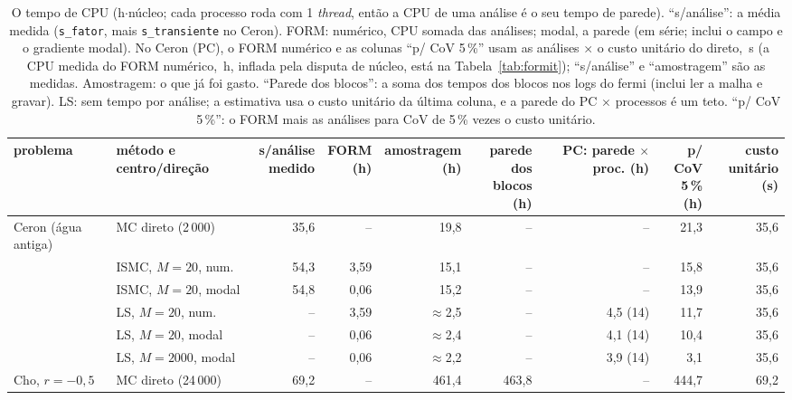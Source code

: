 \begin{landscape}
\begin{table}[H]\centering\footnotesize
\caption{O tempo de CPU (h$\cdot$núcleo; cada processo roda com 1 \emph{thread}, então a CPU de uma análise é o seu tempo de parede). ``s/análise'': a média medida (\texttt{s\_fator}, mais \texttt{s\_transiente} no Ceron). FORM: numérico, CPU somada das análises; modal, a parede (em série; inclui o campo e o gradiente modal). No Ceron (PC), o FORM numérico e as colunas ``p/ CoV 5\,\%'' usam as análises $\times$ o custo unitário do direto, \uDirCe{}\,s (a CPU medida do FORM numérico, \formCeronCpu{}\,h, inflada pela disputa de núcleo, está na Tabela~\ref{tab:formit}); ``s/análise'' e ``amostragem'' são as medidas. Amostragem: o que já foi gasto. ``Parede dos blocos'': a soma dos tempos dos blocos nos logs do fermi (inclui ler a malha e gravar). LS: sem tempo por análise; a estimativa usa o custo unitário da última coluna, e a parede do PC $\times$ processos é um teto. ``p/ CoV 5\,\%'': o FORM mais as análises para CoV de 5\,\% vezes o custo unitário.}\label{tab:tempo}
\begin{tabular}{llrrrrrrr}\toprule
problema & método e centro/direção & \makecell{s/análise\\medido} & \makecell{FORM\\(h)} & \makecell{amostragem\\(h)} & \makecell{parede dos\\blocos (h)} & \makecell{PC: parede\\$\times$ proc. (h)} & \makecell{p/ CoV\\5\,\% (h)} & \makecell{custo\\unitário (s)} \\\midrule
Ceron (água antiga) & MC direto (2\,000) & 35,6 & -- & 19,8 & -- & -- & 21,3 & 35,6 \\
 & ISMC, $M = 20$, num. & 54,3 & 3,59 & 15,1 & -- & -- & 15,8 & 35,6 \\
 & ISMC, $M = 20$, modal & 54,8 & 0,06 & 15,2 & -- & -- & 13,9 & 35,6 \\
 & LS, $M = 20$, num. & -- & 3,59 & $\approx$2,5 & -- & 4,5 (14) & 11,7 & 35,6 \\
 & LS, $M = 20$, modal & -- & 0,06 & $\approx$2,4 & -- & 4,1 (14) & 10,4 & 35,6 \\
 & LS, $M = 2000$, modal & -- & 0,06 & $\approx$2,2 & -- & 3,9 (14) & 3,1 & 35,6 \\
\midrule
Cho, $r = -0{,}5$ & MC direto (24\,000) & 69,2 & -- & 461,4 & 463,8 & -- & 444,7 & 69,2 \\

\end{tabular}
\end{table}
\end{landscape}
